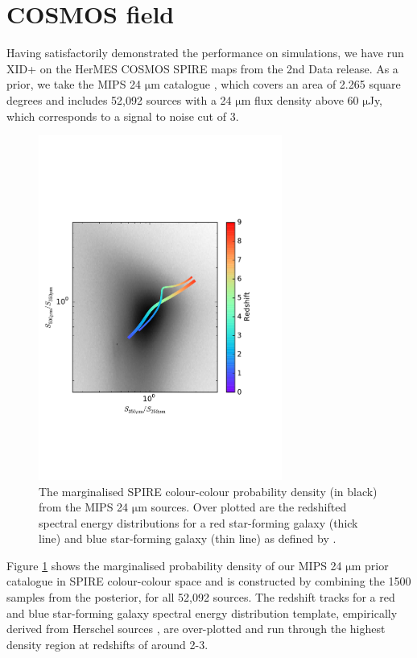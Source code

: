 \documentclass[useAMS,usenatbib]{mnras}
\begin{document}
\section{COSMOS field}\label{sec:COSMOS}
Having satisfactorily demonstrated the performance on simulations, we have run \textsc{XID+} on the HerMES COSMOS SPIRE maps from the 2nd Data release. As a prior, we take the MIPS 24 $\mathrm{\mu m}$ catalogue \citep{LeFLoch:2009}, which covers an area of 2.265 square degrees and includes 52,092 sources with a 24 $\mathrm{\mu m}$ flux density above 60 $\mathrm{\mu}$Jy, which corresponds to a signal to noise cut of 3.
\begin{figure} 
\includegraphics[width=8cm]{colour_colour_track}
\caption{The marginalised SPIRE colour-colour probability density (in black) from the MIPS 24 $\mathrm{\mu m}$ sources. Over plotted are the redshifted spectral energy distributions for a red star-forming galaxy (thick line) and blue star-forming galaxy (thin line) as defined by \protect\citep{Berta:2013}.}\label{fig:col-col}
\end{figure}
Figure \ref{fig:col-col} shows the marginalised probability density of our MIPS 24 $\mathrm{\mu m}$ prior catalogue in SPIRE colour-colour space and is  constructed by combining the 1500 samples from the posterior, for all 52,092 sources. The redshift tracks for a red and blue star-forming galaxy spectral energy distribution template, empirically derived from Herschel sources \citep{Berta:2013}, are over-plotted and run through the highest density region at redshifts of around 2-3.
\end{document}
